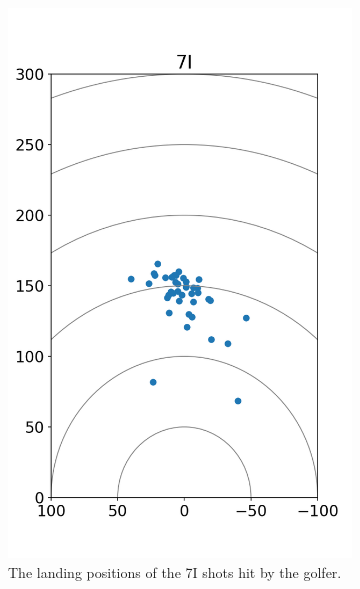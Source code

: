 \documentclass{kththesis}
\begin{document}
\begin{figure}
\begin{subfigure}{0.4\textwidth}
    \includegraphics[height=0.4\textheight]{Shots/7I_shots.png} 
    \caption{The landing positions of the 7I shots hit by the golfer.}
    \label{fig:7I_shots}
    \end{subfigure}
    \begin{subfigure}{0.4\textwidth}
    \centering

\end{subfigure}
\end{figure}
\end{document}
